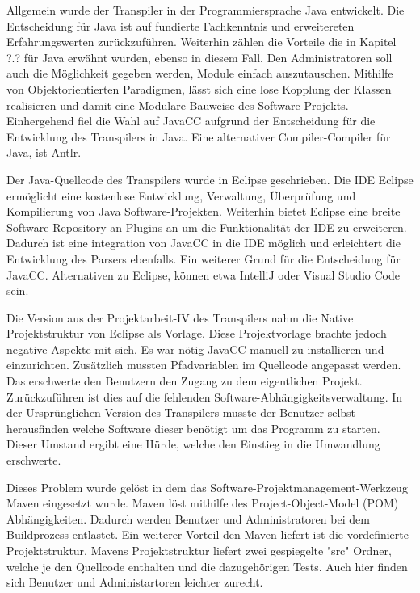 Allgemein wurde der Transpiler in der Programmiersprache Java entwickelt. 
Die Entscheidung für Java ist auf fundierte Fachkenntnis und erweitereten Erfahrungswerten zurückzuführen. Weiterhin zählen die Vorteile die in Kapitel ?.? für Java erwähnt wurden, ebenso in diesem Fall.
Den Administratoren soll auch die Möglichkeit gegeben werden, Module einfach auszutauschen. Mithilfe von Objektorientierten Paradigmen, lässt sich eine lose Kopplung der Klassen realisieren und damit eine Modulare Bauweise des Software Projekts.
Einhergehend fiel die Wahl auf JavaCC aufgrund der Entscheidung für die Entwicklung des Transpilers in Java. Eine alternativer Compiler-Compiler für Java, ist Antlr. 

Der Java-Quellcode des Transpilers wurde in Eclipse geschrieben. Die IDE Eclipse ermöglicht eine kostenlose Entwicklung, Verwaltung, Überprüfung und Kompilierung von Java Software-Projekten. Weiterhin bietet Eclipse eine breite Software-Repository an Plugins an um die Funktionalität der IDE zu erweiteren. Dadurch ist eine integration von JavaCC in die IDE möglich und erleichtert die Entwicklung des Parsers ebenfalls. Ein weiterer Grund für die Entscheidung für JavaCC. Alternativen zu Eclipse, können etwa IntelliJ oder Visual Studio Code sein. 

Die Version aus der Projektarbeit-IV des Transpilers nahm die Native Projektstruktur von Eclipse als Vorlage. Diese Projektvorlage brachte jedoch negative Aspekte mit sich. Es war nötig JavaCC manuell zu installieren und einzurichten. Zusätzlich mussten Pfadvariablen im Quellcode angepasst werden. Das erschwerte den Benutzern den Zugang zu dem eigentlichen Projekt.
Zurückzuführen ist dies auf die fehlenden Software-Abhängigkeitsverwaltung. In der Ursprünglichen Version des Transpilers musste der Benutzer selbst herausfinden welche Software dieser benötigt um das Programm zu starten. Dieser Umstand ergibt eine Hürde, welche den Einstieg in die Umwandlung erschwerte. 

Dieses Problem wurde gelöst in dem das Software-Projektmanagement-Werkzeug Maven eingesetzt wurde. Maven löst mithilfe des Project-Object-Model (POM) Abhängigkeiten. 
Dadurch werden Benutzer und Administratoren bei dem Buildprozess entlastet.
Ein weiterer Vorteil den Maven liefert ist die vordefinierte Projektstruktur. Mavens Projektstruktur liefert zwei gespiegelte "src" Ordner, welche je den Quellcode enthalten und die dazugehörigen Tests.
Auch hier finden sich Benutzer und Administartoren leichter zurecht.

